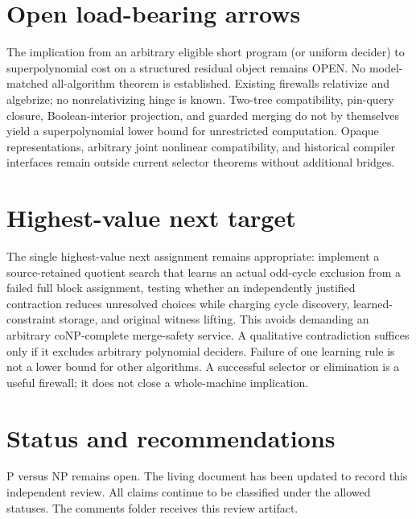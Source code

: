 \documentclass[11pt]{article}
\begin{document}
\section{Open load-bearing arrows}
The implication from an arbitrary eligible short program (or uniform decider) to superpolynomial cost on a structured residual object remains OPEN. No model-matched all-algorithm theorem is established. Existing firewalls relativize and algebrize; no nonrelativizing hinge is known. Two-tree compatibility, pin-query closure, Boolean-interior projection, and guarded merging do not by themselves yield a superpolynomial lower bound for unrestricted computation. Opaque representations, arbitrary joint nonlinear compatibility, and historical compiler interfaces remain outside current selector theorems without additional bridges.

\section{Highest-value next target}
The single highest-value next assignment remains appropriate: implement a source-retained quotient search that learns an actual odd-cycle exclusion from a failed full block assignment, testing whether an independently justified contraction reduces unresolved choices while charging cycle discovery, learned-constraint storage, and original witness lifting. This avoids demanding an arbitrary coNP-complete merge-safety service. A qualitative contradiction suffices only if it excludes arbitrary polynomial deciders. Failure of one learning rule is not a lower bound for other algorithms. A successful selector or elimination is a useful firewall; it does not close a whole-machine implication.

\section{Status and recommendations}
P versus NP remains open. The living document has been updated to record this independent review. All claims continue to be classified under the allowed statuses. The comments folder receives this review artifact.

\end{document}
